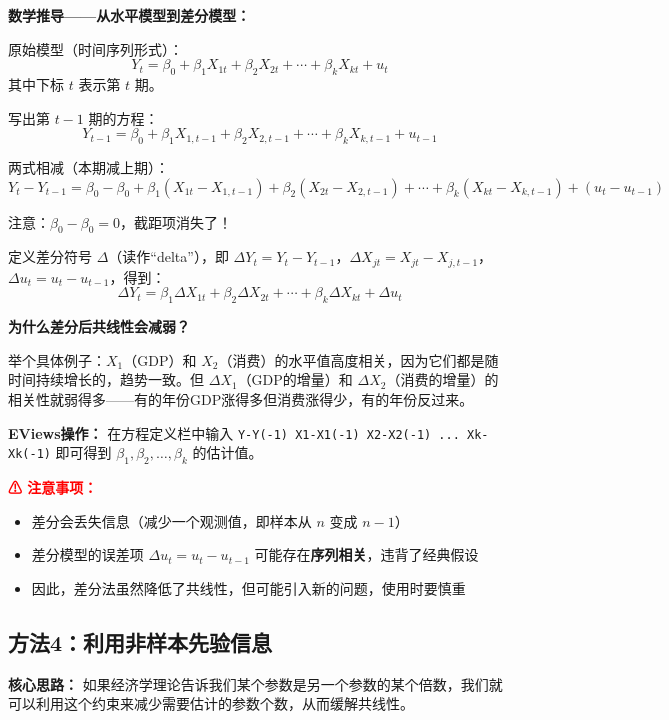 \documentclass[12pt,a4paper]{ctexart}
\begin{document}
\textbf{数学推导——从水平模型到差分模型：}

原始模型（时间序列形式）：
\begin{equation}
Y_t = \beta_0 + \beta_1 X_{1t} + \beta_2 X_{2t} + \cdots + \beta_k X_{kt} + u_t \tag{4.22}
\end{equation}
其中下标 $t$ 表示第 $t$ 期。

写出第 $t-1$ 期的方程：
\[
Y_{t-1} = \beta_0 + \beta_1 X_{1,t-1} + \beta_2 X_{2,t-1} + \cdots + \beta_k X_{k,t-1} + u_{t-1}
\]

两式相减（本期减上期）：
\[
Y_t - Y_{t-1} = \beta_0 - \beta_0 + \beta_1(X_{1t} - X_{1,t-1}) + \beta_2(X_{2t} - X_{2,t-1}) + \cdots + \beta_k(X_{kt} - X_{k,t-1}) + (u_t - u_{t-1})
\]

注意：$\beta_0 - \beta_0 = 0$，截距项消失了！

定义差分符号 $\Delta$（读作“delta”），即 $\Delta Y_t = Y_t - Y_{t-1}$，$\Delta X_{jt} = X_{jt} - X_{j,t-1}$，$\Delta u_t = u_t - u_{t-1}$，得到：
\begin{equation}
\Delta Y_t = \beta_1 \Delta X_{1t} + \beta_2 \Delta X_{2t} + \cdots + \beta_k \Delta X_{kt} + \Delta u_t \tag{4.23}
\end{equation}

\textbf{为什么差分后共线性会减弱？}

举个具体例子：$X_1$（GDP）和 $X_2$（消费）的水平值高度相关，因为它们都是随时间持续增长的，趋势一致。但 $\Delta X_1$（GDP的增量）和 $\Delta X_2$（消费的增量）的相关性就弱得多——有的年份GDP涨得多但消费涨得少，有的年份反过来。

\textbf{EViews操作：} 在方程定义栏中输入 \texttt{Y-Y(-1) X1-X1(-1) X2-X2(-1) ... Xk-Xk(-1)} 即可得到 $\beta_1, \beta_2, \ldots, \beta_k$ 的估计值。

\textcolor{red}{\textbf{⚠ 注意事项：}}
\begin{itemize}
\item 差分会丢失信息（减少一个观测值，即样本从 $n$ 变成 $n-1$）
\item 差分模型的误差项 $\Delta u_t = u_t - u_{t-1}$ 可能存在\textbf{序列相关}，违背了经典假设
\item 因此，差分法虽然降低了共线性，但可能引入新的问题，使用时要慎重
\end{itemize}

\subsection{方法4：利用非样本先验信息}

\textbf{核心思路：} 如果经济学理论告诉我们某个参数是另一个参数的某个倍数，我们就可以利用这个约束来减少需要估计的参数个数，从而缓解共线性。
\end{document}
